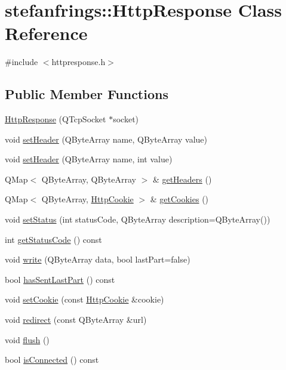 \hypertarget{classstefanfrings_1_1_http_response}{}\section{stefanfrings\+:\+:Http\+Response Class Reference}
\label{classstefanfrings_1_1_http_response}


{\ttfamily \#include $<$httpresponse.\+h$>$}

\subsection*{Public Member Functions}
\begin{DoxyCompactItemize}
\item 
\mbox{\hyperlink{classstefanfrings_1_1_http_response_a97dd17f92a23d9725330978e32cec8d5}{Http\+Response}} (Q\+Tcp\+Socket $\ast$socket)
\item 
void \mbox{\hyperlink{classstefanfrings_1_1_http_response_a41029ee24e05e419e6da7ea970bc3724}{set\+Header}} (Q\+Byte\+Array name, Q\+Byte\+Array value)
\item 
void \mbox{\hyperlink{classstefanfrings_1_1_http_response_ae725069b38ab629f33c9bb6391b4c064}{set\+Header}} (Q\+Byte\+Array name, int value)
\item 
Q\+Map$<$ Q\+Byte\+Array, Q\+Byte\+Array $>$ \& \mbox{\hyperlink{classstefanfrings_1_1_http_response_aade61e2cccc871b06e7a3df86bf15d69}{get\+Headers}} ()
\item 
Q\+Map$<$ Q\+Byte\+Array, \mbox{\hyperlink{classstefanfrings_1_1_http_cookie}{Http\+Cookie}} $>$ \& \mbox{\hyperlink{classstefanfrings_1_1_http_response_a1bcd416f520020e944900e35ab51864c}{get\+Cookies}} ()
\item 
void \mbox{\hyperlink{classstefanfrings_1_1_http_response_a07af281f6437c377e6f729051ce4e13c}{set\+Status}} (int status\+Code, Q\+Byte\+Array description=Q\+Byte\+Array())
\item 
int \mbox{\hyperlink{classstefanfrings_1_1_http_response_a3b73cdd0d5139fb33b9713f6035c2d27}{get\+Status\+Code}} () const
\item 
void \mbox{\hyperlink{classstefanfrings_1_1_http_response_a6e49919cc568835ca6d81fec02533260}{write}} (Q\+Byte\+Array data, bool last\+Part=false)
\item 
bool \mbox{\hyperlink{classstefanfrings_1_1_http_response_a0036711cc0e5273754cdf3fc3dcd2b0e}{has\+Sent\+Last\+Part}} () const
\item 
void \mbox{\hyperlink{classstefanfrings_1_1_http_response_ac32c7fcc332d3f834ec88ae06b2e7d63}{set\+Cookie}} (const \mbox{\hyperlink{classstefanfrings_1_1_http_cookie}{Http\+Cookie}} \&cookie)
\item 
void \mbox{\hyperlink{classstefanfrings_1_1_http_response_afb4d442dd120b515d472aff13074275a}{redirect}} (const Q\+Byte\+Array \&url)
\item 
void \mbox{\hyperlink{classstefanfrings_1_1_http_response_a0d50597cae5e04e6b2110df589c6617e}{flush}} ()
\item 
bool \mbox{\hyperlink{classstefanfrings_1_1_http_response_a1869ed834437286ba88ab72027d12463}{is\+Connected}} () const
\end{DoxyCompactItemize}


